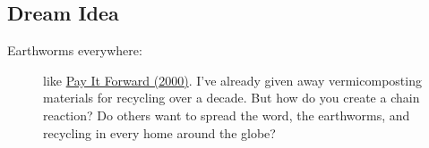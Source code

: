
\subsection*{Dream Idea}

\begin{description}
 \item[Earthworms everywhere:] %
 like \href{https://www.imdb.com/title/tt0223897/}{Pay It Forward (2000)}.
 I've already
 given away vermicomposting materials for recycling
 over a decade. %
But how do you create a chain reaction? Do others want to spread the word, the earthworms, and recycling in every home around the globe?
\end{description} \\ \\
